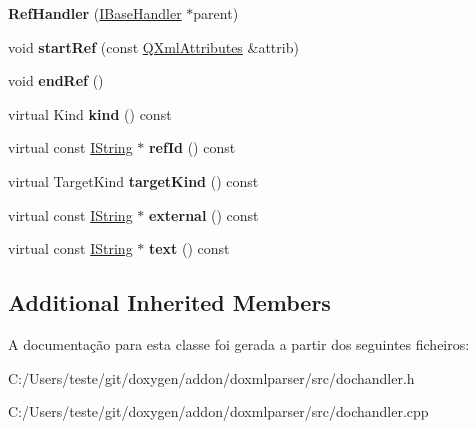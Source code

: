 \begin{DoxyCompactItemize}
\item 
\hypertarget{class_ref_handler_ad24f2a5801313db134ade52549b3ba8f}{{\bfseries Ref\-Handler} (\hyperlink{class_i_base_handler}{I\-Base\-Handler} $\ast$parent)}\label{class_ref_handler_ad24f2a5801313db134ade52549b3ba8f}

\item 
\hypertarget{class_ref_handler_a64b60752227d7af719398c2683cb17bf}{void {\bfseries start\-Ref} (const \hyperlink{class_q_xml_attributes}{Q\-Xml\-Attributes} \&attrib)}\label{class_ref_handler_a64b60752227d7af719398c2683cb17bf}

\item 
\hypertarget{class_ref_handler_a5eda546cbda5a0080fd4b49b62ce964e}{void {\bfseries end\-Ref} ()}\label{class_ref_handler_a5eda546cbda5a0080fd4b49b62ce964e}

\item 
\hypertarget{class_ref_handler_af8e62c8a81ddf2283205cc8955de50eb}{virtual Kind {\bfseries kind} () const }\label{class_ref_handler_af8e62c8a81ddf2283205cc8955de50eb}

\item 
\hypertarget{class_ref_handler_a2488ce15cc44de0c90c8f6116e9d5094}{virtual const \hyperlink{class_i_string}{I\-String} $\ast$ {\bfseries ref\-Id} () const }\label{class_ref_handler_a2488ce15cc44de0c90c8f6116e9d5094}

\item 
\hypertarget{class_ref_handler_a80540c89e6b5cfa5c1ad130337f08db2}{virtual Target\-Kind {\bfseries target\-Kind} () const }\label{class_ref_handler_a80540c89e6b5cfa5c1ad130337f08db2}

\item 
\hypertarget{class_ref_handler_a03ca7bf90446b86c6fd7fff2829a150a}{virtual const \hyperlink{class_i_string}{I\-String} $\ast$ {\bfseries external} () const }\label{class_ref_handler_a03ca7bf90446b86c6fd7fff2829a150a}

\item 
\hypertarget{class_ref_handler_a38ed11cab67ca9bf8d04302e53b86a69}{virtual const \hyperlink{class_i_string}{I\-String} $\ast$ {\bfseries text} () const }\label{class_ref_handler_a38ed11cab67ca9bf8d04302e53b86a69}

\end{DoxyCompactItemize}
\subsection*{Additional Inherited Members}


A documentação para esta classe foi gerada a partir dos seguintes ficheiros\-:\begin{DoxyCompactItemize}
\item 
C\-:/\-Users/teste/git/doxygen/addon/doxmlparser/src/dochandler.\-h\item 
C\-:/\-Users/teste/git/doxygen/addon/doxmlparser/src/dochandler.\-cpp\end{DoxyCompactItemize}
